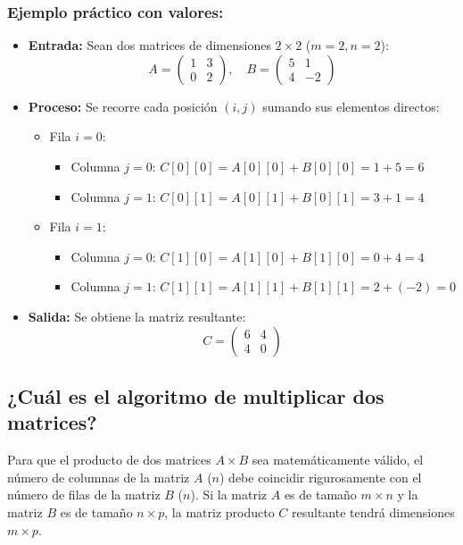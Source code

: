 \documentclass[12pt]{article}
\begin{document}
\subsubsection*{Ejemplo práctico con valores:}
\begin{itemize}
    \item \textbf{Entrada:} Sean dos matrices de dimensiones $2 \times 2$ ($m=2, n=2$):
    \[ A = \begin{pmatrix} 1 & 3 \\ 0 & 2 \end{pmatrix}, \quad B = \begin{pmatrix} 5 & 1 \\ 4 & -2 \end{pmatrix} \]
    \item \textbf{Proceso:} Se recorre cada posición $(i, j)$ sumando sus elementos directos:
    \begin{itemize}
        \item Fila $i=0$:
        \begin{itemize}
            \item Columna $j=0$: $C[0][0] = A[0][0] + B[0][0] = 1 + 5 = 6$
            \item Columna $j=1$: $C[0][1] = A[0][1] + B[0][1] = 3 + 1 = 4$
        \end{itemize}
        \item Fila $i=1$:
        \begin{itemize}
            \item Columna $j=0$: $C[1][0] = A[1][0] + B[1][0] = 0 + 4 = 4$
            \item Columna $j=1$: $C[1][1] = A[1][1] + B[1][1] = 2 + (-2) = 0$
        \end{itemize}
    \end{itemize}
    \item \textbf{Salida:} Se obtiene la matriz resultante:
    \[ C = \begin{pmatrix} 6 & 4 \\ 4 & 0 \end{pmatrix} \]
\end{itemize}

\subsection{¿Cuál es el algoritmo de multiplicar dos matrices?}
Para que el producto de dos matrices $A \times B$ sea matemáticamente válido, el número de columnas de la matriz $A$ ($n$) debe coincidir rigurosamente con el número de filas de la matriz $B$ ($n$). Si la matriz $A$ es de tamaño $m \times n$ y la matriz $B$ es de tamaño $n \times p$, la matriz producto $C$ resultante tendrá dimensiones $m \times p$. 
\end{document}
